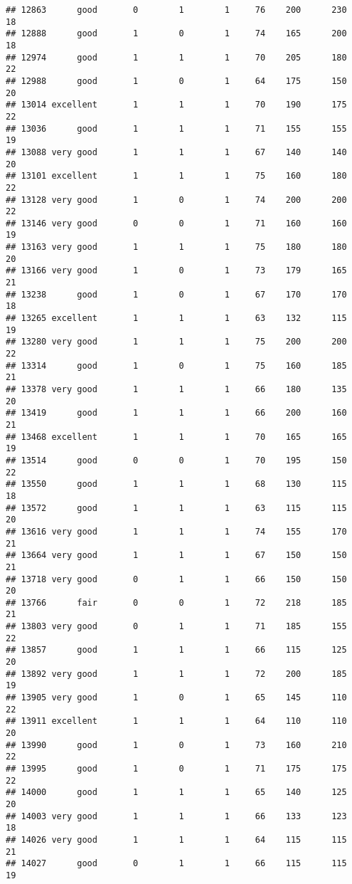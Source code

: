 \documentclass[]{article}
\begin{document}
\begin{verbatim}
## 12863      good       0        1        1     76    200      230  18
## 12888      good       1        0        1     74    165      200  18
## 12974      good       1        1        1     70    205      180  22
## 12988      good       1        0        1     64    175      150  20
## 13014 excellent       1        1        1     70    190      175  22
## 13036      good       1        1        1     71    155      155  19
## 13088 very good       1        1        1     67    140      140  20
## 13101 excellent       1        1        1     75    160      180  22
## 13128 very good       1        0        1     74    200      200  22
## 13146 very good       0        0        1     71    160      160  19
## 13163 very good       1        1        1     75    180      180  20
## 13166 very good       1        0        1     73    179      165  21
## 13238      good       1        0        1     67    170      170  18
## 13265 excellent       1        1        1     63    132      115  19
## 13280 very good       1        1        1     75    200      200  22
## 13314      good       1        0        1     75    160      185  21
## 13378 very good       1        1        1     66    180      135  20
## 13419      good       1        1        1     66    200      160  21
## 13468 excellent       1        1        1     70    165      165  19
## 13514      good       0        0        1     70    195      150  22
## 13550      good       1        1        1     68    130      115  18
## 13572      good       1        1        1     63    115      115  20
## 13616 very good       1        1        1     74    155      170  21
## 13664 very good       1        1        1     67    150      150  21
## 13718 very good       0        1        1     66    150      150  20
## 13766      fair       0        0        1     72    218      185  21
## 13803 very good       0        1        1     71    185      155  22
## 13857      good       1        1        1     66    115      125  20
## 13892 very good       1        1        1     72    200      185  19
## 13905 very good       1        0        1     65    145      110  22
## 13911 excellent       1        1        1     64    110      110  20
## 13990      good       1        0        1     73    160      210  22
## 13995      good       1        0        1     71    175      175  22
## 14000      good       1        1        1     65    140      125  20
## 14003 very good       1        1        1     66    133      123  18
## 14026 very good       1        1        1     64    115      115  21
## 14027      good       0        1        1     66    115      115  19

\end{verbatim}
\end{document}
